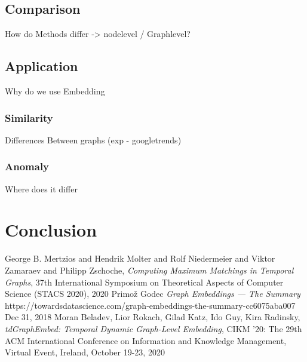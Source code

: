 \documentclass[sigconf]{acmart}
\begin{document}
\subsection{Comparison}
How do Methods differ -> nodelevel / Graphlevel?

\subsection{Application}
Why do we use Embedding
\subsubsection{Similarity}
Differences Between graphs (exp - googletrends)
\subsubsection{Anomaly}
Where does it differ

\section{Conclusion}


\begin{thebibliography}{1}
George B. Mertzios and Hendrik Molter and Rolf Niedermeier and Viktor Zamaraev and Philipp Zschoche,
\emph{Computing Maximum Matchings in Temporal Graphs},
37th International Symposium on Theoretical Aspects of Computer Science (STACS 2020), 2020
Primož Godec \emph{Graph Embeddings — The Summary}\\
https://towardsdatascience.com/graph-embeddings-the-summary-cc6075aba007
Dec 31, 2018
Moran Beladev, Lior Rokach, Gilad Katz, Ido Guy, Kira Radinsky, \emph{tdGraphEmbed: Temporal Dynamic Graph-Level Embedding}, {CIKM} '20: The 29th {ACM} International Conference on Information and Knowledge Management, Virtual Event, Ireland, October 19-23, 2020

\end{thebibliography}
\end{document}
